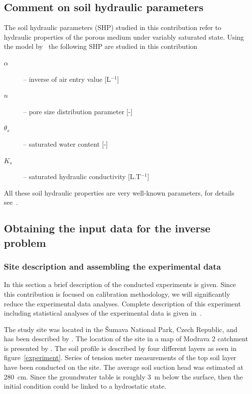 \documentclass[review,times,3p,10pt]{elsarticle}
\begin{document}
{\subsection{Comment on soil hydraulic parameters}
\label{shpdescr}

 The soil hydraulic parameters (SHP) studied in this contribution refer to hydraulic properties of the porous medium under variably saturated state. Using the model by~\cite{vangenuchten} the following SHP are studied in this contribution
\begin{description}
\item[$\alpha$] -- inverse of air entry value [L$^{-1}$]
\item[$n$] -- pore size distribution parameter [-]
\item[$\theta_s$] -- saturated water content [-]
\item[$K_s$] -- saturated hydraulic conductivity [L.T$^{-1}$]
\end{description}
All these soil hydraulic properties are very well-known parameters, for details see~\citep{vangenuchten}.




\subsection{Obtaining the input data for the inverse problem}
\label{assamb}



\subsubsection{Site description and assembling the experimental data}%
\label{site}

\label{povodi}

{In this section a brief description of the conducted experiments is given. Since this contribution is focused on calibration methodology, we will significantly reduce the experimental data analyses. Complete description of this experiment including statistical analyses of the experimental data is given in~\citep{jacka-site}.
}


The study site was located in the \v{S}umava National Park, {Czech Republic}, and has been described by \cite{Jacka1}. The location of the site in a map of Modrava 2 catchment is presented by \cite{Jacka2}.
The soil profile is described by four different layers as seen in figure~\ref{experiment}. 
{Series  of tension meter measurements of the top soil layer have been conducted on the site. The average soil suction head was estimated at 280~cm. Since the groundwater table is roughly 3~m below the surface, then the initial condition could be linked to a hydrostatic state.    }





}
\end{document}
